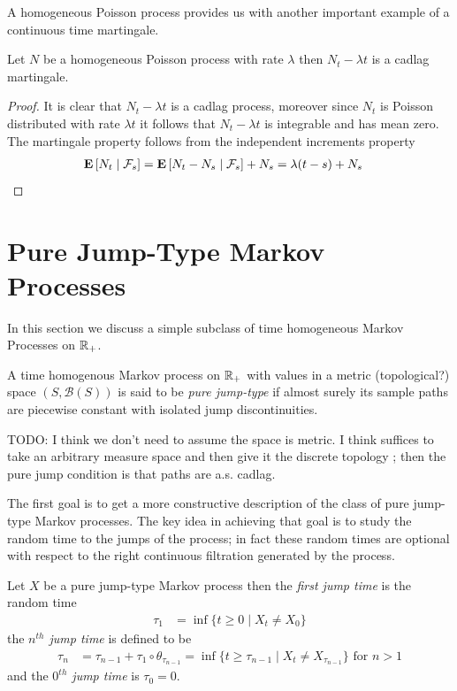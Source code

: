 A homogeneous Poisson process provides us with another important
example of a continuous time martingale.
\begin{prop}\label{CompensatedHomogeneousPoissonProcessMartingale}Let $N$ be a homogeneous Poisson process with rate
  $\lambda$ then $N_t - \lambda t$ is a cadlag martingale.
\end{prop}
\begin{proof}
It is clear that $N_t - \lambda t$ is a cadlag process, moreover since
$N_t$ is Poisson distributed with rate $\lambda t$ it follows that
$N_t - \lambda t$ is integrable and has mean zero.  The martingale
property follows from the independent increments property
\begin{align*}
\cexpectationlong{\mathcal{F}_s}{N_t} 
&=\cexpectationlong{\mathcal{F}_s}{N_t - N_s}  + N_s = \lambda(t-s) + N_s
\end{align*}
\end{proof}

\section{Pure Jump-Type Markov Processes}
In this section we discuss a simple subclass of time homogeneous
Markov Processes on $\reals_+$.
\begin{defn}A time homogenous Markov process on $\reals_+$ with values
  in a metric (topological?) space $(S, \mathcal{B}(S))$ is said to be \emph{pure
    jump-type} if almost surely its sample paths are piecewise
  constant with isolated jump discontinuities.
\end{defn}

TODO: I think we don't need to assume the space is metric.   I think suffices to take an arbitrary measure space and then give it the discrete topology ; then the pure jump condition is that paths are a.s. cadlag.

The first goal is to get a more constructive description of the class
of pure jump-type Markov processes.  The key idea in achieving that goal
is to study the random time to the jumps of the process; in fact these
random times are optional with respect to the right continuous
filtration generated by the process.

\begin{defn}Let $X$ be a pure jump-type Markov process then the
  \emph{first jump time} is the random time
\begin{align*}
\tau_1 &=\inf \lbrace t \geq 0 \mid X_t \neq X_0 \rbrace
\end{align*}
 the \emph{$n^{th}$ jump time} is defined to be 
\begin{align*}
\tau_n &= \tau_{n-1} + \tau_1 \circ \theta_{\tau_{n-1}} = \inf \lbrace
t \geq \tau_{n-1} \mid X_t \neq X_{\tau_{n-1}} \rbrace \text{ for $n > 1$}
\end{align*}
and the \emph{$0^{th}$ jump time} is $\tau_0 = 0$.
\end{defn}

